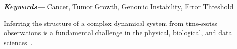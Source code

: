 \documentclass[10pt, aps, rmp,  twocolumn, superscriptaddress, floatfix, showkeys]{revtex4-2}
\providecommand{\keywords}[1]{\textbf{\textit{Keywords---}} #1}
\begin{document}
\keywords{Cancer, Tumor Growth, Genomic Instability, Error Threshold}

\maketitle

Inferring the structure of a complex dynamical system from time-series observations is a fundamental challenge in the physical, biological, and data sciences~\cite{newman2018network,peixoto2025network,nitzan2017revealing,timme2007revealing, brunton2016discovering}. 
\end{document}
